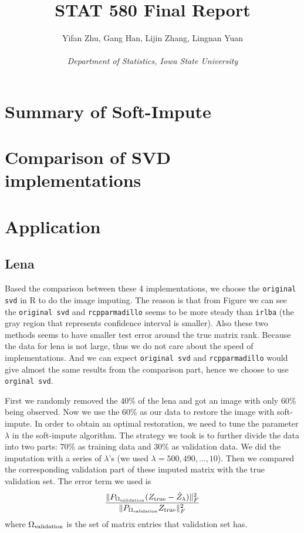 \documentclass{article}
\begin{document}
	

	
	\title{\bf STAT 580 Final Report}
	\author{Yifan Zhu, Gang Han, Lijin Zhang, Lingnan Yuan\\ \  \\ \textit{Department of Statistics, Iowa State University}}
	\date{}
	\maketitle
	
	\section{Summary of Soft-Impute}

	\cite{hastie2015statistical, mazumder2010spectral}
	\section{Comparison of SVD implementations}
	\section{Application}
	\subsection{Lena}
	Based the comparison between these 4 implementations, we choose the \verb|original svd| in R to do the image imputing. The reason is that from {\color{red}Figure} we can see the \verb|original svd| and \verb|rcpparmadillo| seems to be more steady than \verb|irlba| (the gray region that represents confidence interval is smaller). Also these two methods seems to have smaller test error around the true matrix rank. Because the data for lena is not large, thus we do not care about the speed of implementations. And we can expect \verb|original svd| and \verb|rcpparmadillo| would give almost the same results from the comparison part, hence we choose to use \verb|orginal svd|. 

	First we randomly removed the 40\% of the lena and got an image with only 60\% being observed. Now we use the 60\% as our data to restore the image with soft-impute. In order to obtain an optimal restoration, we need to tune the parameter $\lambda$ in the soft-impute algorithm. The strategy we took is to further divide the data into two parts: 70\% as training data and 30\% as validation data. We did the imputation with a series of $\lambda$'s (we used $\lambda = 500, 490, \ldots, 10$). Then we compared the corresponding validation part of these imputed matrix with the true validation set. The error term we used is
	\begin{equation}\label{valid_error}
	\frac{\|P_{\Omega_{\rm validation}}(Z_{\rm true} - \hat{Z}_{\lambda})\|^2_{F}}{\|P_{\Omega_{\rm validation}} Z_{\rm true}\|_{F}^2}
	\end{equation}
	where $\Omega_{\rm validation}$ is the set of matrix entries that validation set has.
\end{document}

